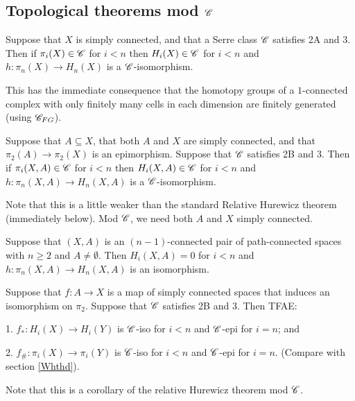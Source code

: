 \documentclass[11pt]{article}
\begin{document}
{\subsection{Topological theorems mod \texorpdfstring{$\mathscr{C}$}{C}}
\begin{thm*}
Suppose that $X$ is simply connected, and that a Serre class $\mathscr{C}$ satisfies \textup{2A} and \textup{3}. Then if $\pi_i(X)\in\mathscr{C}$ for $i<n$ then $H_i(X)\in\mathscr{C}$ for $i<n$ and $h:\pi_n(X)\to H_n(X)$ is a $\mathscr{C}$-isomorphism.
\end{thm*}
This has the immediate consequence that the homotopy groups of a $1$-connected complex with only finitely many cells in each dimension are finitely generated (using $\mathscr{C}_{FG}$).
\begin{thm*}
Suppose that $A\subseteq X$, that both $A$ and $X$ are simply connected, and that $\pi_2(A)\to\pi_2(X)$ is an epimorphism. Suppose that $\mathscr{C}$ satisfies \textup{2B} and \textup{3}. Then if $\pi_i(X,A)\in\mathscr{C}$ for $i<n$ then $H_i(X,A)\in\mathscr{C}$ for $i<n$ and $h:\pi_n(X,A)\to H_n(X,A)$ is a $\mathscr{C}$-isomorphism.
\end{thm*}
Note that this is a little weaker than the standard Relative Hurewicz theorem (immediately below). Mod $\mathscr{C}$, we need both $A$ and $X$ simply connected.
\begin{thm*}
Suppose that $(X,A)$ is an $(n-1)$-connected pair of path-connected spaces with $n\geq2$ and $A\neq\emptyset$. Then $H_i(X,A)=0$ for $i<n$ and $h:\pi_n(X,A)\to H_n(X,A)$ is an isomorphism.
\end{thm*}
\begin{thm*}\label{WhthdModC}
Suppose that $f:A\to X$ is a map of simply connected spaces that induces an isomorphism on $\pi_2$. Suppose that $\mathscr{C}$ satisfies \textup{2B} and \textup{3}. Then TFAE:
\begin{itemise}
\item[1.] $f_*:H_i(X)\to H_i(Y)$ is $\mathscr{C}$-iso for $i<n$ and $\mathscr{C}$-epi for $i=n$; and
\item[2.] $f_\#:\pi_i(X)\to \pi_i(Y)$ is $\mathscr{C}$-iso for $i<n$ and $\mathscr{C}$-epi for $i=n$. \hfill (Compare with section \ref{Whthd}).
\end{itemise}
\end{thm*}
Note that this is a corollary of the relative Hurewicz theorem mod $\mathscr{C}$.


}
\end{document}
